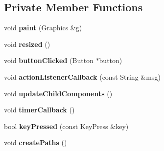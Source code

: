 \subsection*{Private Member Functions}
\begin{DoxyCompactItemize}
\item 
\hypertarget{classControlPanel_ac6971b9a71d13685f444cb6bb1ca2334}{void {\bfseries paint} (Graphics \&g)}\label{classControlPanel_ac6971b9a71d13685f444cb6bb1ca2334}

\item 
\hypertarget{classControlPanel_a63ab3761114921ef049e50e598a159ae}{void {\bfseries resized} ()}\label{classControlPanel_a63ab3761114921ef049e50e598a159ae}

\item 
\hypertarget{classControlPanel_a9225b9ace95a2418b70473acbcd03641}{void {\bfseries button\-Clicked} (Button $\ast$button)}\label{classControlPanel_a9225b9ace95a2418b70473acbcd03641}

\item 
\hypertarget{classControlPanel_a342fb2fdbffe41c69197be84347bf57a}{void {\bfseries action\-Listener\-Callback} (const String \&msg)}\label{classControlPanel_a342fb2fdbffe41c69197be84347bf57a}

\item 
\hypertarget{classControlPanel_aa433a41f4ff41ed416b4e7a7198672ad}{void {\bfseries update\-Child\-Components} ()}\label{classControlPanel_aa433a41f4ff41ed416b4e7a7198672ad}

\item 
\hypertarget{classControlPanel_af8620f539537d65a921731392f3a12ff}{void {\bfseries timer\-Callback} ()}\label{classControlPanel_af8620f539537d65a921731392f3a12ff}

\item 
\hypertarget{classControlPanel_ade499872219cfc2d96d14489c306d55a}{bool {\bfseries key\-Pressed} (const Key\-Press \&key)}\label{classControlPanel_ade499872219cfc2d96d14489c306d55a}

\item 
\hypertarget{classControlPanel_aa3b90d1032c9688b161afb23c06df7cc}{void {\bfseries create\-Paths} ()}\label{classControlPanel_aa3b90d1032c9688b161afb23c06df7cc}

\end{DoxyCompactItemize}
